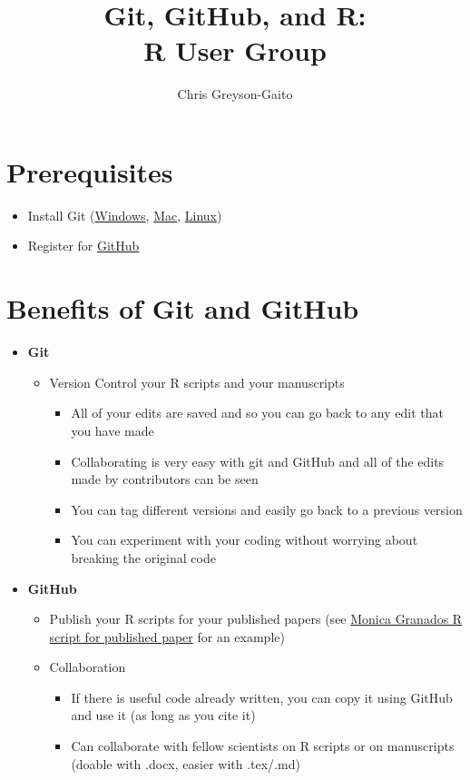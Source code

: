 \documentclass[12pt,letterpaper]{article} %
\begin{document}
\title{Git, GitHub, and R:\\ R User Group}
\author{Chris Greyson-Gaito}
\date{}
\maketitle
\section*{Prerequisites}
\begin{itemize}
\item Install Git (\href{https://git-scm.com/download/win}{Windows}, \href{https://git-scm.com/download/mac}{Mac}, \href{https://git-scm.com/download/linux}{Linux})
\item Register for \href{https://github.com/join?source=header-home}{GitHub}
\end{itemize}
\section*{Benefits of Git and GitHub}
\begin{itemize}
\item \textbf{Git}
\begin{itemize}
\item Version Control your R scripts and your manuscripts
\begin{itemize}
\item All of your edits are saved and so you can go back to any edit that you have made
\item Collaborating is very easy with git and GitHub and all of the edits made by contributors can be seen
\item You can tag different versions and easily go back to a previous version
\item You can experiment with your coding without worrying about breaking the original code
\end{itemize}
\end{itemize}
\item \textbf{GitHub}
\begin{itemize}
\item Publish your R scripts for your published papers (see \href{https://github.com/Monsauce/Food-web-modules-and-individual-growth-rate}{Monica Granados R script for published paper} for an example)
\item Collaboration
\begin{itemize}
\item If there is useful code already written, you can copy it using GitHub and use it (as long as you cite it)
\item Can collaborate with fellow scientists on R scripts or on manuscripts (doable with .docx, easier with .tex/.md)
\end{itemize}
\end{itemize}
\end{itemize}
\end{document}

